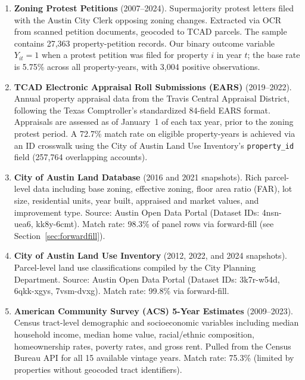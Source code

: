 \begin{enumerate}
    \item \textbf{Zoning Protest Petitions} (2007--2024). Supermajority protest letters filed
    with the Austin City Clerk opposing zoning changes.
    Extracted via OCR from scanned petition documents, geocoded to TCAD parcels.
    The sample contains 27,363 property-petition records. Our binary outcome variable
    $Y_{it} = 1$ when a protest petition was filed for property $i$ in year $t$; the
    base rate is 5.75\% across all property-years, with 3,004 positive observations.

    \item \textbf{TCAD Electronic Appraisal Roll Submissions (EARS)} (2019--2022).
    Annual property appraisal data from the Travis Central Appraisal District,
    following the Texas Comptroller's standardized 84-field EARS format.
    Appraisals are assessed as of January~1 of each tax year, prior to the zoning protest period.
    A 72.7\% match rate on eligible property-years is achieved via an ID crosswalk
    using the City of Austin Land Use Inventory's \texttt{property\_id} field
    (257,764 overlapping accounts).

    \item \textbf{City of Austin Land Database} (2016 and 2021 snapshots).
    Rich parcel-level data including base zoning, effective zoning, floor area ratio (FAR),
    lot size, residential units, year built, appraised and market values, and improvement type.
    Source: Austin Open Data Portal (Dataset IDs: 4nsn-uea6, kk8y-6cmt).
    Match rate: 98.3\% of panel rows via forward-fill (see Section~\ref{sec:forwardfill}).

    \item \textbf{City of Austin Land Use Inventory} (2012, 2022, and 2024 snapshots).
    Parcel-level land use classifications compiled by the City Planning Department.
    Source: Austin Open Data Portal (Dataset IDs: 3k7r-w54d, 6qkk-xgys, 7vsm-dvxg).
    Match rate: 99.8\% via forward-fill.

    \item \textbf{American Community Survey (ACS) 5-Year Estimates} (2009--2023).
    Census tract-level demographic and socioeconomic variables
    including median household income, median home value, racial/ethnic composition,
    homeownership rates, poverty rates, and gross rent.
    Pulled from the Census Bureau API for all 15 available vintage years.
    Match rate: 75.3\% (limited by properties without geocoded tract identifiers).
\end{enumerate}


